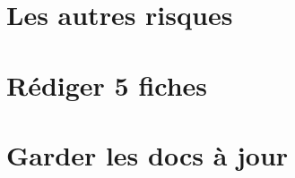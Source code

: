 \documentclass{report}
\begin{document}
\section*{Les autres risques}

\section*{Rédiger 5 fiches}

\section*{Garder les docs à jour}
\end{document}
